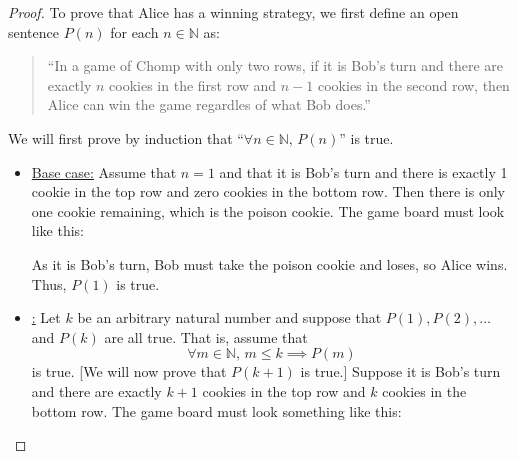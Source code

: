 \documentclass[11pt]{article}
\theoremstyle{plain}
\theoremstyle{plain}
\theoremstyle{remark}
\def\naturals{\mathbb{N}}
\begin{document}
\begin{proof}
 To prove that Alice has a winning strategy, we first define an open sentence $P(n)$ for each $n\in\naturals$ as: 
 \begin{quotation}
  \noindent ``In a game of Chomp with only two rows, if it is Bob's turn and there are exactly $n$ cookies in the first row and $n-1$ cookies in the second row, then Alice can win the game regardles of what Bob does.''
 \end{quotation}
 We will first prove by induction that ``$\forall n\in\naturals,\, P(n)$'' is true.
 \begin{itemize}
  \item\underline{Base case:} Assume that $n=1$ and that it is Bob's turn and there is exactly 1 cookie in the top row and zero cookies in the bottom row. Then there is only one cookie remaining, which is the poison cookie. The game board must look like this:
  \begin{center}
\end{center}
  As it is Bob's turn, Bob must take the poison cookie and loses, so Alice wins. Thus, $P(1)$ is true.
\item\underline{:} Let $k$ be an arbitrary natural number and suppose that $P(1),P(2),\dots$ and $P(k)$ are all true. That is, assume that
\[
 \forall m\in\naturals,\, m\leq k \implies P(m) \tag{Induction hypothesis}
\]
is true.
[We will now prove that $P(k+1)$ is true.] Suppose it is Bob's turn and there are exactly $k+1$ cookies in the top row and $k$ cookies in the bottom row. The game board must look something like this:
\begin{center}
\end{center}
\end{itemize}
\end{proof}
\end{document}
